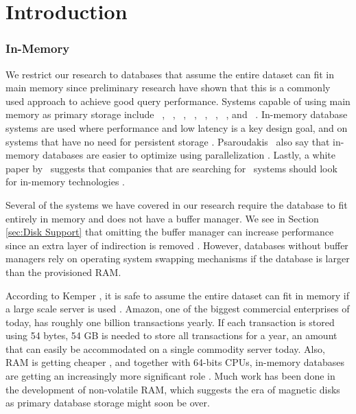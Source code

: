\chapter{Introduction}
\label{chap:introduction}





\subsection{In-Memory}
\label{sub:In-Memory}
We restrict our research to databases that assume the entire dataset can fit in main memory since preliminary research have shown that this is a commonly used approach to achieve good query performance. Systems capable of using main memory as primary storage include \oracle~\cite{Lahiri2015-mz}, \saph~\cite{Farber2012-vh}, \gorilla~\cite{Pelkonen2015-ko}, \qlikview~\cite{Qlik2011-ef}, \tableau~\cite{Kamkolkar2015-iq}, \monetdb~\cite{Boncz2002-yj}, \blink~\cite{Barber2012-xt}, and \sapnw~\cite{Lemke2010-is}. In-memory database systems are used where performance and low latency is a key design goal, and on systems that have no need for persistent storage \cite{Zicari2012-is}. Psaroudakis \ea~also say that in-memory databases are easier to optimize using parallelization \cite{Psaroudakis2013-fn}. Lastly, a white paper by \qlikview~suggests that companies that are searching for \bi~systems should look for in-memory technologies \cite{Bereanu2010-tj}. 

Several of the systems we have covered in our research require the database to fit entirely in memory and does not have a buffer manager. We see in Section \ref{sec:Disk Support} that omitting the buffer manager can increase performance since an extra layer of indirection is removed \cite{Ferrari2012-hm, Graefe2014-ds}. However, databases without buffer managers rely on operating system swapping mechanisms if the database is larger than the provisioned RAM.

According to Kemper \ea, it is safe to assume the entire dataset can fit in memory if a large scale server is used \cite{Kemper2011-ap}. Amazon, one of the biggest commercial enterprises of today, has roughly one billion transactions yearly. If each transaction is stored using 54 bytes, 54 GB is needed to store all transactions for a year, an amount that can easily be accommodated on a single commodity server today. Also, RAM is getting cheaper \cite{Exasol2014-xh}, and together with 64-bits CPUs, in-memory databases are getting an increasingly more significant role \cite{Delaney2014-ip}. Much work has been done in the development of non-volatile RAM, which suggests the era of magnetic disks as primary database storage might soon be over. 

